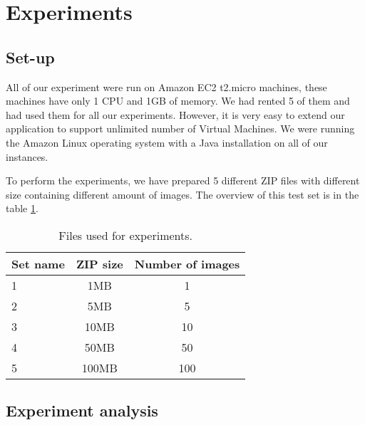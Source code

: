 \section{Experiments}
\label{exp}

\subsection{Set-up}
All of our experiment were run on Amazon EC2 t2.micro machines, these machines have only 1 CPU and 1GB of memory. We had rented 5 of them and had used them for all our experiments. However, it is very easy to extend our application to support unlimited number of Virtual Machines. We were running the Amazon Linux operating system with a Java installation on all of our instances.

To perform the experiments, we have prepared 5 different ZIP files with different size containing different amount of images. The overview of this test set is in the table \ref{testset}.

\begin{table}
\centering
 \label{testset}
 \begin{tabular}{| l | c | c |}
  \hline
  Set name & ZIP size & Number of images \\
  \hline
  \hline
  1 & 1MB & 1\\
  2 & 5MB & 5\\
  3 & 10MB & 10\\
  4 & 50MB & 50\\
  5 & 100MB & 100\\
  \hline
 \end{tabular}

 \caption{Files used for experiments.}
\end{table}

\subsection{Experiment analysis}

